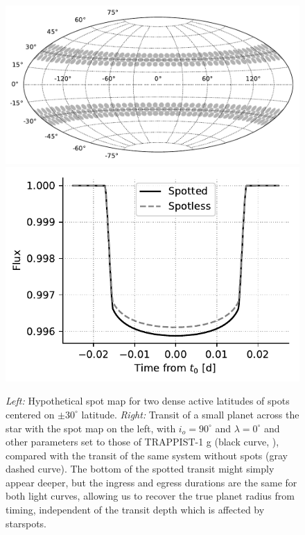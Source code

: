 \begin{figure}%
    \centering
    \includegraphics[scale=0.5]{robin/spot_map_2.pdf}
    \includegraphics[scale=0.6]{robin/transit_quad_2.pdf}
    \caption{\textsl{Left:} Hypothetical spot map for two dense active latitudes of spots centered on $\pm 30^\circ$ latitude. \textsl{Right:} Transit of a small planet across the star with the spot map on the left, with $i_o = 90^\circ$ and $\lambda = 0^\circ$ and other parameters set to those of TRAPPIST-1 g (black curve, \citealt{Delrez2018}), compared with the transit of the same system without spots (gray dashed curve). The bottom of the spotted transit might simply appear deeper, but the ingress and egress durations are the same for both light curves, allowing us to recover the true planet radius from timing, independent of the transit depth which is affected by starspots.}
    \label{fig:map2}
\end{figure}

